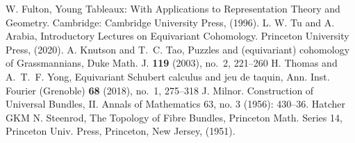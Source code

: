\begin{thebibliography}{99}
  
   W. Fulton, Young Tableaux: With Applications to Representation Theory and Geometry. Cambridge: Cambridge University Press, (1996).
   L. W. Tu and A. Arabia, Introductory Lectures on Equivariant Cohomology. Princeton University Press, (2020).
   A. Knutson and T.~C. Tao, Puzzles and (equivariant) cohomology of Grassmannians, Duke Math. J. {\bf 119} (2003), no.~2, 221--260 
   H. Thomas and A.~T.~F. Yong, Equivariant Schubert calculus and jeu de taquin, Ann. Inst. Fourier (Grenoble) {\bf 68} (2018), no.~1, 275--318
   J. Milnor. Construction of Universal Bundles, II. Annals of Mathematics 63, no. 3 (1956): 430–36.
   Hatcher
   GKM
   N. Steenrod, The Topology of Fibre Bundles, Princeton Math. Series 14,
  Princeton Univ. Press, Princeton, New Jersey, (1951).

\end{thebibliography}